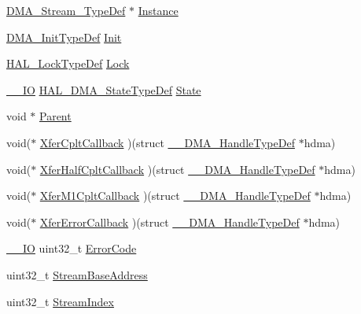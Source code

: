 \begin{DoxyCompactItemize}
\item 
\hyperlink{struct_d_m_a___stream___type_def}{D\+M\+A\+\_\+\+Stream\+\_\+\+Type\+Def} $\ast$ \hyperlink{struct_____d_m_a___handle_type_def_ac4b645b1c2beb1107dbec7dae98747e1}{Instance}
\item 
\hyperlink{struct_d_m_a___init_type_def}{D\+M\+A\+\_\+\+Init\+Type\+Def} \hyperlink{struct_____d_m_a___handle_type_def_a3792cb34cedb0e2ab204e41b53ef75ad}{Init}
\item 
\hyperlink{stm32f4xx__hal__def_8h_ab367482e943333a1299294eadaad284b}{H\+A\+L\+\_\+\+Lock\+Type\+Def} \hyperlink{struct_____d_m_a___handle_type_def_a005e867f695aa4b85aca665af7345b51}{Lock}
\item 
\hyperlink{core__sc300_8h_aec43007d9998a0a0e01faede4133d6be}{\+\_\+\+\_\+\+IO} \hyperlink{group___d_m_a___exported___types_ga9c012af359987a240826f29073bbe463}{H\+A\+L\+\_\+\+D\+M\+A\+\_\+\+State\+Type\+Def} \hyperlink{struct_____d_m_a___handle_type_def_a9759b676141bec799cdab94c3e08e6e4}{State}
\item 
void $\ast$ \hyperlink{struct_____d_m_a___handle_type_def_af42684decd26b1c5d49a529fcf99be30}{Parent}
\item 
void($\ast$ \hyperlink{struct_____d_m_a___handle_type_def_a4f323d8234b3f5f454a639e9df3cba23}{Xfer\+Cplt\+Callback} )(struct \hyperlink{struct_____d_m_a___handle_type_def}{\+\_\+\+\_\+\+D\+M\+A\+\_\+\+Handle\+Type\+Def} $\ast$hdma)
\item 
void($\ast$ \hyperlink{struct_____d_m_a___handle_type_def_a2e343c6a9135222a8efb8ca5bb5dad8c}{Xfer\+Half\+Cplt\+Callback} )(struct \hyperlink{struct_____d_m_a___handle_type_def}{\+\_\+\+\_\+\+D\+M\+A\+\_\+\+Handle\+Type\+Def} $\ast$hdma)
\item 
void($\ast$ \hyperlink{struct_____d_m_a___handle_type_def_a5968053a3674b44460c1aa150499e01d}{Xfer\+M1\+Cplt\+Callback} )(struct \hyperlink{struct_____d_m_a___handle_type_def}{\+\_\+\+\_\+\+D\+M\+A\+\_\+\+Handle\+Type\+Def} $\ast$hdma)
\item 
void($\ast$ \hyperlink{struct_____d_m_a___handle_type_def_a5905bba1de7dc9d803a50dfb44d0a9e8}{Xfer\+Error\+Callback} )(struct \hyperlink{struct_____d_m_a___handle_type_def}{\+\_\+\+\_\+\+D\+M\+A\+\_\+\+Handle\+Type\+Def} $\ast$hdma)
\item 
\hyperlink{core__sc300_8h_aec43007d9998a0a0e01faede4133d6be}{\+\_\+\+\_\+\+IO} uint32\+\_\+t \hyperlink{struct_____d_m_a___handle_type_def_a67a2a8b907bc9b5c0af87f9de2bffc29}{Error\+Code}
\item 
uint32\+\_\+t \hyperlink{struct_____d_m_a___handle_type_def_ab9250d33bdf9de7b87fa4325382518c4}{Stream\+Base\+Address}
\item 
uint32\+\_\+t \hyperlink{struct_____d_m_a___handle_type_def_a3ada2bc091757d7b92ab8ca70211ccae}{Stream\+Index}
\end{DoxyCompactItemize}


